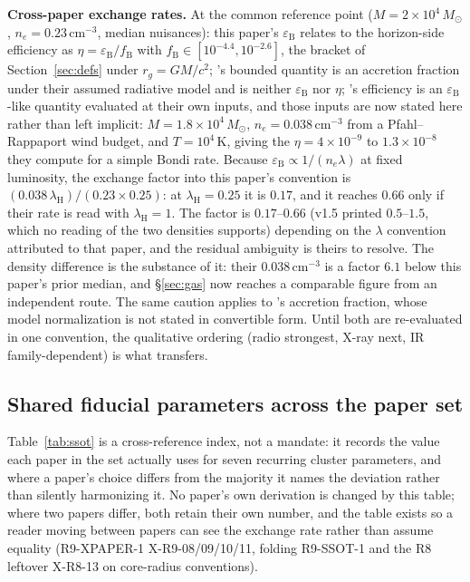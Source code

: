 \documentclass[11pt]{article}
\newcommand{\msun}{\ensuremath{M_\odot}}
\newcommand{\eps}{\ensuremath{\varepsilon_{\mathrm{B}}}}
\begin{document}
\textbf{Cross-paper exchange rates.} At the common reference point ($M = 2\times10^{4}\,\msun$, $n_{e} = 0.23\,\mathrm{cm^{-3}}$, median nuisances): this paper's $\eps$ relates to the horizon-side efficiency as $\eta = \eps/f_{\mathrm{B}}$ with $f_{\mathrm{B}} \in [10^{-4.4}, 10^{-2.6}]$, the bracket of Section~\ref{sec:defs} under $r_{g} = GM/c^{2}$; \citet{Mahida2026}'s bounded quantity is an accretion fraction under their assumed radiative model and is neither $\eps$ nor $\eta$; \citet{Haggard2013}'s efficiency is an $\eps$-like quantity evaluated at their own inputs, and those inputs are now stated here rather than left implicit: $M = 1.8\times10^{4}\,\msun$, $n_{e} = 0.038\,\mathrm{cm^{-3}}$ from a Pfahl--Rappaport wind budget, and $T = 10^{4}$\,K, giving the $\eta = 4\times10^{-9}$ to $1.3\times10^{-8}$ they compute for a simple Bondi rate. Because $\eps \propto 1/(n_{e}\lambda)$ at fixed luminosity, the exchange factor into this paper's convention is $(0.038\,\lambda_{\mathrm{H}})/(0.23 \times 0.25)$: at $\lambda_{\mathrm{H}} = 0.25$ it is $0.17$, and it reaches $0.66$ only if their rate is read with $\lambda_{\mathrm{H}} = 1$. The factor is $0.17$--$0.66$ (v1.5 printed $0.5$--$1.5$, which no reading of the two densities supports) depending on the $\lambda$ convention attributed to that paper, and the residual ambiguity is theirs to resolve. The density difference is the substance of it: their $0.038\,\mathrm{cm^{-3}}$ is a factor $6.1$ below this paper's prior median, and \S\ref{sec:gas} now reaches a comparable figure from an independent route. The same caution applies to \citeauthor{Mahida2026}'s accretion fraction, whose model normalization is not stated in convertible form. Until both are re-evaluated in one convention, the qualitative ordering (radio strongest, X-ray next, IR family-dependent) is what transfers.

\subsection{Shared fiducial parameters across the paper set}
\label{app:ssot}

Table~\ref{tab:ssot} is a cross-reference index, not a mandate: it records the value
each paper in the set actually uses for seven recurring cluster parameters,
and where a paper's choice differs from the majority it names the deviation
rather than silently harmonizing it. No paper's own derivation is changed by
this table; where two papers differ, both retain their own number, and the
table exists so a reader moving between papers can see the exchange rate
rather than assume equality (R9-XPAPER-1 X-R9-08/09/10/11, folding R9-SSOT-1
and the R8 leftover X-R8-13 on core-radius conventions).
\end{document}
